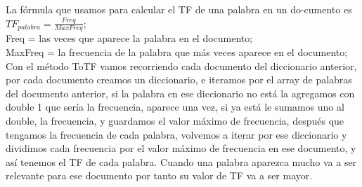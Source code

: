 \documentclass[12pt, a4paper]{article}
\begin{document}
\begin{enumerate}
                  La fórmula que usamos para calcular el TF de una palabra
                  en un do-cumento es
            $TF_{palabra}=\frac{Freq}{MaxFreq}$;\\
            Freq = las veces que aparece la palabra en el documento;\\
            MaxFreq = la frecuencia de la palabra que más veces aparece en el documento;\\
            Con el método ToTF vamos recorriendo cada documento del diccionario anterior,
            por cada documento creamos un diccionario, e iteramos por el array de
            palabras del documento anterior, si la palabra en ese diccionario no
            está la agregamos con double 1 que sería la frecuencia, aparece una vez,
            si ya está le sumamos uno al double, la frecuencia,
            y guardamos el valor máximo de frecuencia, después que tengamos
            la frecuencia de cada palabra, volvemos a iterar por ese diccionario y
            dividimos cada frecuencia por el valor máximo de frecuencia en ese documento,
            y así tenemos el TF de cada palabra. Cuando una palabra aparezca mucho va a ser
            relevante para ese documento por tanto su valor de TF va a ser mayor.


\end{enumerate}
\end{document}
